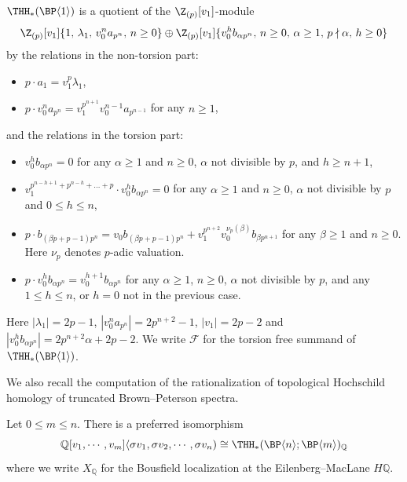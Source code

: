 \begin{theorem}\label{thm:AHL}
  $\THH_*(\BP \langle 1 \rangle)$ is a quotient of the $\Z_{(p)}[v_1]$-module
  \begin{multline}
    \Z_{(p)}[v_1]\{1,\, \lambda_1,\, v_0^n a_{p^n},\,n\geq 0\} 
    \oplus \Z_{(p)}[v_1]\{v_0^h b_{\alpha p^n},\, n\geq 0,\, \alpha\geq 1,\, p\nmid \alpha,\, h \geq 0\}
  \end{multline}
  by the relations in the non-torsion part:
  \begin{itemize}
  \item $p\cdot a_1 = v_1^p \lambda_1$,
  \item $p\cdot v_0^n a_{p^n} = v_1^{p^{n+1}}v_0^{n-1} a_{p^{n-1}}$ for any $n\geq 1$,
  \end{itemize}
  and the relations in the torsion part:
  \begin{itemize}
  \item $v_0^{h} b_{\alpha p^n} = 0$ for any $\alpha \geq 1$ and $n \geq 0$, $\alpha$ not divisible by $p$, and $h \geq n + 1$,
  \item $v_1^{p^{n-h+1}+p^{n-h}+\dots+p }\cdot v_0^h b_{\alpha p^n} = 0$ for any $\alpha \geq 1$ and $n \geq 0$, $\alpha$ not divisible by $p$ and  $0 \leq h \leq n$,
  \item $p\cdot b_{(\beta p+p-1)p^n} = v_0 b_{(\beta p+p-1)p^n}+v_1^{p^{n+2}}v_0^{\nu_p(\beta)} b_{\beta p^{n+1}}$ for any $\beta \geq 1$ and $n \geq 0$. Here $\nu_p$ denotes $p$-adic valuation.
  \item $p\cdot v_0^h b_{\alpha p^n} = v_0^{h+1} b_{\alpha p^n}$ for any $\alpha \geq 1$, $n \geq 0$, $\alpha$ not divisible by $p$, and any $1 \leq h \leq n$, or $h=0$ not in the previous case.
  \end{itemize}
Here $|\lambda_1|=2p-1$, $|v_0^na_{p^n}|=2p^{n+2}-1$, $|v_1|=2p-2$ and $|v_0^hb_{\alpha p^n}|=2p^{n+2}\alpha+2p-2$. We write $\mathcal{F}$ for the torsion free summand of $\THH_*(\BP\langle 1\rangle)$. 
\end{theorem}

We also recall the computation of the rationalization of topological Hochschild homology of truncated Brown--Peterson spectra. 

\begin{proposition}\label{prop:rational}
Let $0\le m\le n$. There is a preferred isomorphism 
\[ 
\mathbb{Q}[v_1,\cdots ,v_m]\langle\sigma v_1,\sigma v_2,\cdots ,\sigma v_n) \cong \THH_*(\BP\langle n\rangle ; \BP\langle m\rangle)_{\mathbb{Q}} 
\]
where we write $X_{\mathbb{Q}}$ for the Bousfield localization at the Eilenberg--MacLane $H\mathbb{Q}$. 
\end{proposition}
